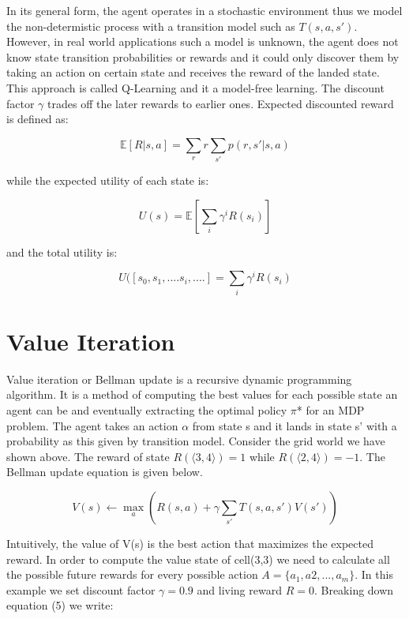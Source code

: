 \documentclass[10pt,a4paper,twocolumn]{article}
\begin{document}
	In its general form, the agent operates in a stochastic environment thus we model the non-determistic process with a transition model such as $T(s,a,s')$. However, in real world applications such a model is unknown, the agent does not know state transition probabilities or rewards and it could only discover them by taking an action on certain state and receives the reward of the landed state. This approach is called Q-Learning and it a model-free learning. The discount factor $\gamma$ trades off the later rewards to earlier ones. Expected discounted reward is defined as:
	
	\begin{equation}
		\mathbb{E}[R | s,a] = \sum_{r}r \sum_{s'}p(r, s' | s, a)
	\end{equation}
	
	while the expected utility of each state is:
	
	\begin{equation}
		U(s) = \mathbb{E}[ \sum_{i}\gamma^{i}R(s_{i})]
	\end{equation}
	
	
	and the total utility is:
	
	\begin{equation}
		U([s_{0}, s_{1}, .... s_{i}, ....] = \sum_{i}\gamma^{i}R(s_{i})
	\end{equation}
	
	\section{Value Iteration}
	Value iteration or Bellman update is a recursive dynamic programming algorithm. It is a method of computing the best values for each possible state an agent can be and eventually extracting the optimal policy $\pi$* for an MDP problem. The agent takes an action $\alpha$ from state s and it lands in state s’ with a probability as this given by transition model. Consider the grid world we have shown above. The reward of state $R(\big \langle 3,4 \big \rangle) = 1$ while $R(\big \langle 2,4 \big \rangle) = -1$. The Bellman update equation is given below.
	
	\begin{equation}
		V(s) \leftarrow \max_{a} { ( R(s,a) + \gamma \sum_{s'}T(s,a,s')V(s') )}
	\end{equation}
	
	Intuitively, the value of V(s) is the best action that maximizes the expected reward. In order to compute the value state of cell(3,3) we need to calculate all the possible future rewards for every possible action $A = \{ a_{1}, a{2}, ..., a_{m} \}$. In this example we set discount factor $\gamma = 0.9$ and living reward $R=0$. Breaking down equation (5) we write:
	
\end{document}

